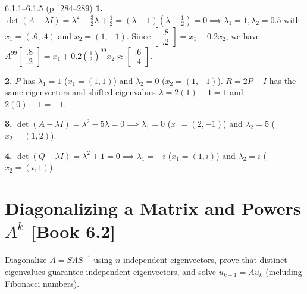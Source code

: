 \documentclass[11pt,a4paper,openany,oneside]{book}
\def\vect#1{#1}%
\def\mathbf#1{#1}%
\def\bk#1{ [Book #1]}%
\newcommand{\vect}[1]{\mathbf{#1}}
\numberwithin{equation}{chapter}
\newcommand{\bk}[1]{\texorpdfstring{\enspace{\normalfont\small\color{slate}[Book #1]}}{ [Book #1]}}
\begin{document}
\vfill
\begin{pageend_sol}{6.1.1--6.1.5 (p.\ 284--289)}
\textbf{1.} $\det(A-\lambda I) = \lambda^2 - \frac{3}{2}\lambda + \frac{1}{2} = (\lambda-1)(\lambda-\frac{1}{2}) = 0 \implies \lambda_1=1, \lambda_2=0.5$ with $\vect{x}_1=(.6,.4)$ and $\vect{x}_2=(1,-1)$. Since $\begin{bmatrix}.8\\.2\end{bmatrix} = \vect{x}_1 + 0.2\vect{x}_2$, we have $A^{99}\begin{bmatrix}.8\\.2\end{bmatrix} = \vect{x}_1 + 0.2\left(\frac{1}{2}\right)^{99}\vect{x}_2 \approx \begin{bmatrix}.6\\.4\end{bmatrix}$.

\textbf{2.} $P$ has $\lambda_1 = 1$ ($\vect{x}_1=(1,1)$) and $\lambda_2 = 0$ ($\vect{x}_2=(1,-1)$). $R = 2P - I$ has the same eigenvectors and shifted eigenvalues $\lambda = 2(1)-1 = 1$ and $2(0)-1 = -1$.

\textbf{3.} $\det(A-\lambda I) = \lambda^2 - 5\lambda = 0 \implies \lambda_1 = 0$ ($\vect{x}_1 = (2,-1)$) and $\lambda_2 = 5$ ($\vect{x}_2 = (1,2)$).

\textbf{4.} $\det(Q-\lambda I) = \lambda^2 + 1 = 0 \implies \lambda_1 = -i$ ($\vect{x}_1 = (1,i)$) and $\lambda_2 = i$ ($\vect{x}_2 = (i,1)$).
\end{pageend_sol}
\clearpage

\section{Diagonalizing a Matrix and Powers $A^k$\bk{6.2}}

\begin{goal}
Diagonalize $A = S\Lambda S^{-1}$ using $n$ independent eigenvectors, prove that distinct eigenvalues guarantee independent eigenvectors, and solve $\vect{u}_{k+1} = A\vect{u}_k$ (including Fibonacci numbers).
\end{goal}
\end{document}
